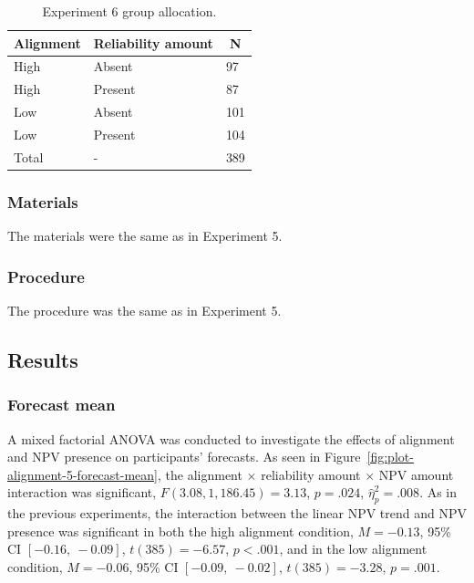 \documentclass[a4paper, nobind, dvipsnames]{templates/ociamthesis}
\theoremstyle{definition}
\theoremstyle{definition}
\theoremstyle{definition}
\theoremstyle{definition}
\theoremstyle{remark}
\begin{document}
\begin{table}[tbp]

\begin{center}
\begin{threeparttable}

\caption{\label{tab:condition-allocation-alignment-5}Experiment 6 group allocation.}

\begin{tabular}{lll}
\toprule
Alignment & \multicolumn{1}{c}{Reliability amount} & \multicolumn{1}{c}{N}\\
\midrule
High & Absent & 97\\
High & Present & 87\\
Low & Absent & 101\\
Low & Present & 104\\
Total & - & 389\\
\bottomrule
\end{tabular}

\end{threeparttable}
\end{center}

\end{table}

\hypertarget{materials-14}{%
\subsubsection{Materials}\label{materials-14}}

The materials were the same as in Experiment 5.

\hypertarget{procedure-10}{%
\subsubsection{Procedure}\label{procedure-10}}

The procedure was the same as in Experiment 5.

\hypertarget{results-8}{%
\subsection{Results}\label{results-8}}

\hypertarget{forecast-mean-2}{%
\subsubsection{Forecast mean}\label{forecast-mean-2}}

A mixed factorial ANOVA was conducted to investigate the effects of alignment
and NPV presence on participants' forecasts. As seen in
Figure~\ref{fig:plot-alignment-5-forecast-mean}, the alignment \(\times\)
reliability amount \(\times\) NPV amount interaction was significant,
\(F(3.08, 1,186.45) = 3.13\), \(p = .024\), \(\hat{\eta}^2_p = .008\).
As in the previous experiments, the interaction between the linear
NPV trend and NPV presence was significant in both the high alignment condition,
\(M = -0.13\), 95\% CI \([-0.16,~-0.09]\), \(t(385) = -6.57\), \(p < .001\), and in the
low alignment condition,
\(M = -0.06\), 95\% CI \([-0.09,~-0.02]\), \(t(385) = -3.28\), \(p = .001\).
\end{document}
